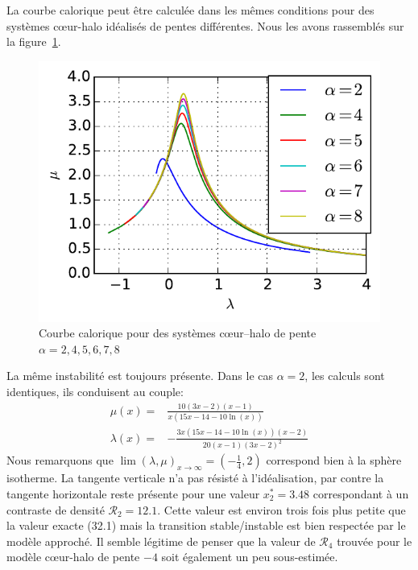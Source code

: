 	La courbe calorique peut être calculée dans les mêmes conditions pour des systèmes cœur-halo idéalisés de pentes différentes. Nous les avons
	rassemblés sur la figure~\ref{ToyModel::AllAlpha}.
	\begin{figure}
			\centering \includegraphics{theorie/graphe/alpha_all.pdf}
			\caption{Courbe calorique pour des systèmes cœur--halo de pente $\alpha=2, 4, 5, 6, 7, 8$\label{ToyModel::AllAlpha}}
	\end{figure}
	La même instabilité est toujours présente. Dans le cas $\alpha=2$, les calculs sont identiques, ils conduisent au couple:
	\begin{eqnarray}
		\mu(x) =& \frac{10 (3x-2) (x-1)}{x(15x-14-10\ln(x))} \\
		\lambda(x) =& -\frac{3x(15x-14-10\ln(x))(x-2)}{20(x-1)(3x-2)^2}
	\end{eqnarray}
	Nous remarquons que $\lim(\lambda,\mu)_{x\to\infty}=(-\frac{1}{4},2)$ correspond bien à la sphère isotherme. La tangente verticale n'a pas
	résisté à l'idéalisation, par contre la tangente horizontale reste présente pour une valeur $x^*_2=3.48$ correspondant à un contraste de
	densité $\mathcal{R}_2= 12.1$. Cette valeur est environ trois fois plus petite que la valeur exacte (32.1) mais la transition stable/instable
	est bien respectée par le modèle approché. Il semble légitime de penser que la valeur de $\mathcal{R}_4$ trouvée pour le modèle cœur-halo de
	pente $-4$ soit également un peu sous-estimée.
